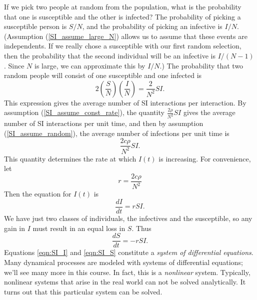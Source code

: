 \documentclass[reqno]{immbook}
\numberwithin{equation}{chapter}
\numberwithin{question}{section}
\numberwithin{theorem}{chapter}
\numberwithin{figure}{chapter}
\theoremstyle{definition}
\begin{document}
If we pick two people at random from
the population, what is the probability that one is
susceptible and the other is infected? The probability
of picking a susceptible person is $S/N$, and the probability
of picking an infective is $I/N$.
(Assumption (\ref{SI_assume_large_N}) allows us to assume
that these events are independents.
If we really chose a susceptible with our first random
selection, then the probability that the second individual
will be an infective is $I/(N-1)$.  Since $N$ is large,
we can approximate this by $I/N$.)
The probability that two random
people will consist of one susceptible and one infected
is
\begin{equation}
    2\left(\frac{S}{N}\right)\left(\frac{I}{N}\right) = \frac{2}{N^2}SI.
\end{equation}
This expression gives
the average number of SI interactions per
interaction.
By assumption (\ref{SI_assume_const_rate}),
the quantity $\frac{2\rho}{N^2}SI$
gives the average number of SI interactions per unit time,
and then by assumption (\ref{SI_assume_random}),
the average number of infections per unit time is
\begin{equation}
   \frac{2c\rho}{N^2}SI.
\end{equation}
This quantity determines the rate at which $I(t)$
is increasing.
For convenience, let
\begin{equation}
   r = \frac{2c\rho}{N^2}
\end{equation}
Then the equation for $I(t)$ is
\begin{equation}
  \frac{dI}{dt} = r S I.
\label{eqn:SI_I}
\end{equation}
We have just two classes of individuals,
the infectives and the susceptible,
so any gain in $I$ must result in an equal
loss in $S$.  Thus
\begin{equation}
  \frac{dS}{dt} = -r S I.
\label{eqn:SI_S}
\end{equation}
Equations \eqref{eqn:SI_I} and \eqref{eqn:SI_S}
constitute a \emph{system of differential equations}.
Many dynamical processes are modeled with systems of differential
equations; we'll see many more in this course.
In fact, this is a \emph{nonlinear} system.
Typically, nonlinear systems
that arise in the real world can not be solved analytically.
It turns out that this particular system can be solved.
\end{document}

